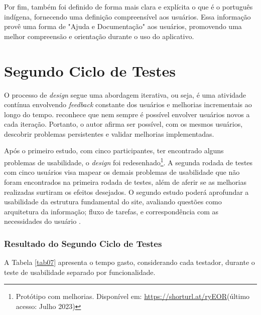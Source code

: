 Por fim, também foi definido de forma mais clara e explícita o que é o português indígena, fornecendo uma definição compreensível aos usuários. Essa informação provê uma forma de "Ajuda e Documentação" aos usuários, promovendo uma melhor 
compreensão e orientação durante o uso do aplicativo.


\section{Segundo Ciclo de Testes}
\label{sec:Segundo Ciclo}
O processo de \textit{design} segue uma abordagem iterativa, ou seja, é uma atividade contínua envolvendo \textit{feedback} constante dos usuários e melhorias incrementais ao longo do tempo.  
reconhece que nem sempre é possível envolver usuários novos a cada iteração. Portanto, o autor afirma ser possível, com os mesmos usuários, descobrir problemas persistentes e validar melhorias implementadas. 

Após o primeiro estudo, com cinco participantes, ter encontrado alguns problemas de usabilidade, o \textit{design} foi redesenhado\footnote{Protótipo com melhorias. Disponível em: \url{https://shorturl.at/ryEOR}(último acesso: Julho 2023)}. 
A segunda rodada de testes com cinco usuários visa mapear os demais problemas de usabilidade que não foram encontrados na primeira rodada de testes, além de aferir se as melhorias realizadas surtiram os efeitos desejados. O segundo estudo poderá aprofundar a 
usabilidade da estrutura fundamental do site, avaliando questões como arquitetura da informação; fluxo de tarefas, e correspondência com as necessidades do usuário \cite{usabilitytest}.

\subsubsection{Resultado do Segundo Ciclo de Testes}
\label{sec:Resultado do Segundo Ciclo de Testes}
A Tabela \ref{tab07} apresenta o tempo gasto, considerando cada testador, durante o teste de usabilidade separado por funcionalidade.

